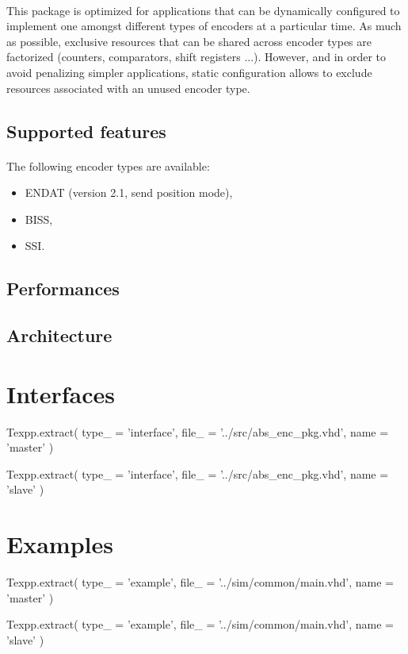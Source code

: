 \documentclass[12pt]{article}
\begin{document}
\paragraph{}
This package is optimized for applications that can be dynamically configured
to implement one amongst different types of encoders at a particular time. As
much as possible, exclusive resources that can be shared across encoder types
are factorized (counters, comparators, shift registers ...). However, and in
order to avoid penalizing simpler applications, static configuration allows to
exclude resources associated with an unused encoder type.


\subsection{Supported features}
\todo
\paragraph{}
The following encoder types are available:
\begin{itemize}
 \item ENDAT (version 2.1, send position mode),
 \item BISS,
 \item SSI.
\end{itemize}


\subsection{Performances}
\todo


\subsection{Architecture}
\todo



\newpage
\section{Interfaces}

\begin{texpp}
Texpp.extract(
type_ = 'interface',
file_ = '../src/abs_enc_pkg.vhd',
name = 'master'
)
\end{texpp}

\begin{texpp}
Texpp.extract(
type_ = 'interface',
file_ = '../src/abs_enc_pkg.vhd',
name = 'slave'
)
\end{texpp}


\newpage
\section{Examples}

\begin{texpp}
Texpp.extract(
type_ = 'example',
file_ = '../sim/common/main.vhd',
name = 'master'
)
\end{texpp}

\begin{texpp}
Texpp.extract(
type_ = 'example',
file_ = '../sim/common/main.vhd',
name = 'slave'
)
\end{texpp}
\end{document}
